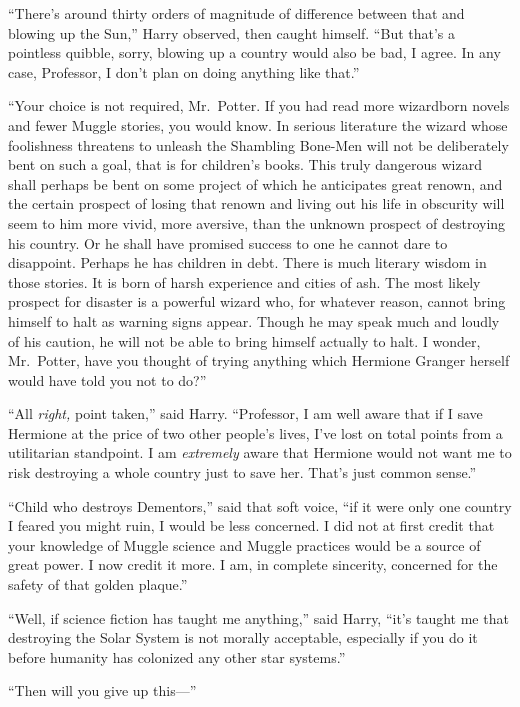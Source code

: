 “There’s around thirty orders of magnitude of difference between that and blowing up the Sun,” Harry observed, then caught himself. “But that’s a pointless quibble, sorry, blowing up a country would also be bad, I agree. In any case, Professor, I don’t plan on doing anything like that.”

“Your choice is not required, Mr.~Potter. If you had read more wizardborn novels and fewer Muggle stories, you would know. In serious literature the wizard whose foolishness threatens to unleash the Shambling Bone-Men will not be deliberately bent on such a goal, that is for children’s books. This truly dangerous wizard shall perhaps be bent on some project of which he anticipates great renown, and the certain prospect of losing that renown and living out his life in obscurity will seem to him more vivid, more aversive, than the unknown prospect of destroying his country. Or he shall have promised success to one he cannot dare to disappoint. Perhaps he has children in debt. There is much literary wisdom in those stories. It is born of harsh experience and cities of ash. The most likely prospect for disaster is a powerful wizard who, for whatever reason, cannot bring himself to halt as warning signs appear. Though he may speak much and loudly of his caution, he will not be able to bring himself actually to halt. I wonder, Mr.~Potter, have you thought of trying anything which Hermione Granger herself would have told you not to do?”

“All \emph{right,} point taken,” said Harry. “Professor, I am well aware that if I save Hermione at the price of two other people’s lives, I’ve lost on total points from a utilitarian standpoint. I am \emph{extremely} aware that Hermione would not want me to risk destroying a whole country just to save her. That’s just common sense.”

“Child who destroys Dementors,” said that soft voice, “if it were only one country I feared you might ruin, I would be less concerned. I did not at first credit that your knowledge of Muggle science and Muggle practices would be a source of great power. I now credit it more. I am, in complete sincerity, concerned for the safety of that golden plaque.”

“Well, if science fiction has taught me anything,” said Harry, “it’s taught me that destroying the Solar System is not morally acceptable, especially if you do it before humanity has colonized any other star systems.”

“Then will you give up this—”

